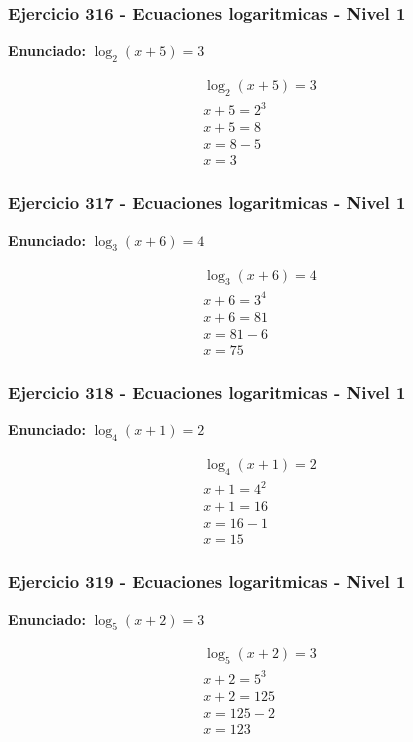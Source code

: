 \documentclass[12pt,a4paper]{article}
\begin{document}
\subsubsection*{Ejercicio 316 - Ecuaciones logaritmicas - Nivel 1}
\textbf{Enunciado:} \(\log_{2}\left(x+5\right)=3\)

\[
\begin{aligned}
\log_{2}\left(x+5\right)=3\\
x+5=2^{3}\\
x+5=8\\
x=8-5\\
\boxed{x=3}
\end{aligned}
\]


\subsubsection*{Ejercicio 317 - Ecuaciones logaritmicas - Nivel 1}
\textbf{Enunciado:} \(\log_{3}\left(x+6\right)=4\)

\[
\begin{aligned}
\log_{3}\left(x+6\right)=4\\
x+6=3^{4}\\
x+6=81\\
x=81-6\\
\boxed{x=75}
\end{aligned}
\]


\subsubsection*{Ejercicio 318 - Ecuaciones logaritmicas - Nivel 1}
\textbf{Enunciado:} \(\log_{4}\left(x+1\right)=2\)

\[
\begin{aligned}
\log_{4}\left(x+1\right)=2\\
x+1=4^{2}\\
x+1=16\\
x=16-1\\
\boxed{x=15}
\end{aligned}
\]


\subsubsection*{Ejercicio 319 - Ecuaciones logaritmicas - Nivel 1}
\textbf{Enunciado:} \(\log_{5}\left(x+2\right)=3\)

\[
\begin{aligned}
\log_{5}\left(x+2\right)=3\\
x+2=5^{3}\\
x+2=125\\
x=125-2\\
\boxed{x=123}
\end{aligned}
\]
\end{document}

